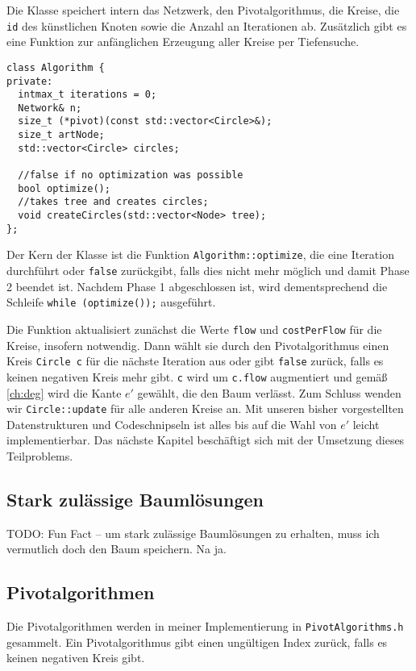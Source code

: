 Die Klasse speichert intern das Netzwerk, den Pivotalgorithmus, die Kreise, die \lstinline|id| des künstlichen Knoten sowie die Anzahl an Iterationen ab. Zusätzlich gibt es eine Funktion zur anfänglichen Erzeugung aller Kreise per Tiefensuche.

\begin{lstlisting}
class Algorithm {
private:
  intmax_t iterations = 0;
  Network& n;
  size_t (*pivot)(const std::vector<Circle>&);
  size_t artNode;
  std::vector<Circle> circles;

  //false if no optimization was possible
  bool optimize();
  //takes tree and creates circles;
  void createCircles(std::vector<Node> tree);
};
\end{lstlisting}

Der Kern der Klasse ist die Funktion \lstinline|Algorithm::optimize|, die eine Iteration durchführt oder \lstinline|false| zurückgibt, falls dies nicht mehr möglich und damit Phase 2 beendet ist. Nachdem Phase 1 abgeschlossen ist, wird dementsprechend die Schleife \lstinline|while (optimize());| ausgeführt.
 
Die Funktion aktualisiert zunächst die Werte \lstinline|flow| und \lstinline|costPerFlow| für die Kreise, insofern notwendig. Dann wählt sie durch den Pivotalgorithmus einen Kreis \lstinline|Circle c| für die nächste Iteration aus oder gibt \lstinline|false| zurück, falls es keinen negativen Kreis mehr gibt. \lstinline|c| wird um \lstinline|c.flow| augmentiert und gemäß \cref{ch:deg} wird die Kante $e'$ gewählt, die den Baum verlässt. Zum Schluss wenden wir \lstinline|Circle::update| für alle anderen Kreise an. Mit unseren bisher vorgestellten Datenstrukturen und Codeschnipseln ist alles bis auf die Wahl von $e'$ leicht implementierbar. Das nächste Kapitel beschäftigt sich mit der Umsetzung dieses Teilproblems.

\subsection{Stark zulässige Baumlösungen}
TODO: Fun Fact – um stark zulässige Baumlösungen zu erhalten, muss ich vermutlich doch den Baum speichern. Na ja.

\subsection{Pivotalgorithmen}
Die Pivotalgorithmen werden in meiner Implementierung in \lstinline|PivotAlgorithms.h| gesammelt. Ein Pivotalgorithmus gibt einen ungültigen Index zurück, falls es keinen negativen Kreis gibt.


